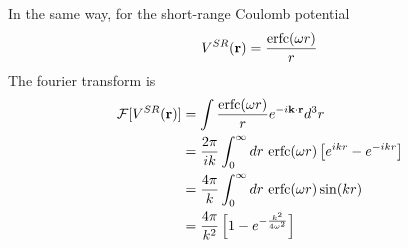 \documentclass{article}
\begin{document}
        In the same way, for the short-range Coulomb potential
        \begin{equation}
            V^{SR}(\textbf{r}) = \frac{{\rm erfc}(\omega r)}{r}
        \end{equation}
        The fourier transform is
        \begin{align}
            \mathcal{F}[V^{SR}(\textbf{r})] &= \int \frac{{\rm erfc}(\omega r)}{r} e^{-i\textbf{k}\cdot\textbf{r}} d^3r\notag\\
            &= \frac{2\pi}{ik} \int_0^\infty dr\ {\rm erfc}(\omega r)\left[e^{ikr}-e^{-ikr}\right]\notag\\
            &= \frac{4\pi}{k} \int_0^\infty dr\ {\rm erfc}(\omega r)\sin(kr)\notag\\
            &= \frac{4\pi}{k^2} \left[1-e^{-\frac{k^2}{4\omega^2}}\right]
        \end{align}
        
\end{document}
